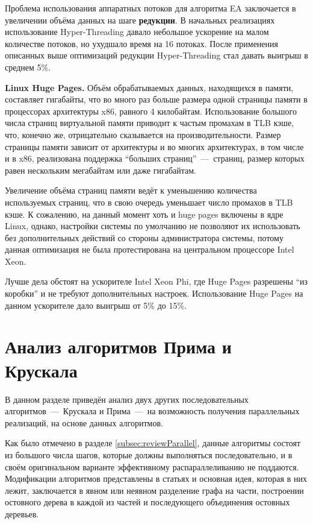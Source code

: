 \documentclass[a4paper,12pt]{extarticle}
\let\stdsection\section
\renewcommand\section{
    \newpage
    \stdsection
}
\begin{document}
Проблема использования аппаратных потоков для алгоритма EA заключается в увеличении объёма данных на шаге \textbf{редукции}. В начальных реализациях использование Hyper-Threading давало небольшое
ускорение на малом количестве потоков, но ухудшало время на 16 потоках. После применения описанных выше оптимизаций редукции Hyper-Threading стал давать выигрыш в среднем 5\%.



\textbf{Linux Huge Pages.}
Объём обрабатываемых данных, находящихся в памяти, составляет гигабайты, что во много раз больше размера одной страницы памяти в процессорах архитектуры x86, равного 4 килобайтам. Использование большого числа страниц виртуальной памяти приводит к частым промахам в TLB кэше, что, конечно же, отрицательно сказывается на производительности.
Размер страницы памяти зависит от архитектуры и во многих архитектурах, в том числе и в x86, реализована поддержка ``больших страниц''~---~страниц, размер которых равен нескольким мегабайтам или даже гигабайтам.

Увеличение объёма страниц памяти ведёт к уменьшению количества используемых страниц, что в свою очередь уменьшает число промахов в TLB кэше.
К сожалению, на данный момент хоть и huge pages включены в ядре Linux, однако, настройки системы по умолчанию не позволяют их использовать без дополнительных действий со стороны администратора системы, потому данная оптимизация не была протестирована на центральном процессоре Intel Xeon.

Лучше дела обстоят на ускорителе Intel Xeon Phi, где Huge Pages разрешены ``из коробки'' и не требуют дополнительных настроек. Использование Huge Pages на данном ускорителе дало выигрыш от 5\% до 15\%.



\section{Анализ алгоритмов Прима и Крускала}
\label{sec:algoOther}

В данном разделе приведён анализ двух других последовательных алгоритмов~---~Крускала и Прима~---~на возможность получения параллельных реализаций, на основе данных алгоритмов.

Как было отмечено в разделе \ref{subsec:reviewParallel}, данные алгоритмы состоят из большого числа шагов, которые должны выполняться последовательно, и в своём оригинальном варианте эффективному распараллеливанию не поддаются.
Модификации алгоритмов представлены в статьях \cite{boruvka-prima, kruskal-parallel} и основная идея, которая в них лежит, заключается в явном или неявном разделение графа на части, построении остовного дерева в каждой из частей и последующего объединения остовных деревьев.
\end{document}
